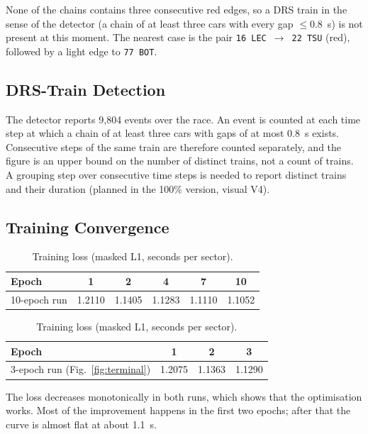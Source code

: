\documentclass[11pt,a4paper]{article}
\begin{document}
None of the chains contains three consecutive red edges, so a DRS train in the
sense of the detector (a chain of at least three cars with every gap $\le 0.8$~s)
is not present at this moment. The nearest case is the pair
\texttt{16 LEC}~$\to$~\texttt{22 TSU} (red), followed by a light edge to
\texttt{77 BOT}.

\subsection{DRS-Train Detection}
The detector reports 9{,}804 events over the race. An event is counted at each
time step at which a chain of at least three cars with gaps of at most 0.8~s
exists. Consecutive steps of the same train are therefore counted separately,
and the figure is an upper bound on the number of distinct trains, not a
count of trains. A grouping step over consecutive time steps is needed to
report distinct trains and their duration (planned in the 100\% version,
visual V4).

\subsection{Training Convergence}
\begin{table}[H]
\centering
\caption{Training loss (masked L1, seconds per sector).}
\label{tab:loss}
\small
\begin{tabular}{@{}lccccc@{}}
\toprule
\textbf{Epoch} & 1 & 2 & 4 & 7 & 10 \\
\midrule
10-epoch run & 1.2110 & 1.1405 & 1.1283 & 1.1110 & 1.1052 \\
\bottomrule
\end{tabular}

\vspace{1mm}
\begin{tabular}{@{}lccc@{}}
\toprule
\textbf{Epoch} & 1 & 2 & 3 \\
\midrule
3-epoch run (Fig.~\ref{fig:terminal}) & 1.2075 & 1.1363 & 1.1290 \\
\bottomrule
\end{tabular}
\end{table}
The loss decreases monotonically in both runs, which shows that the
optimisation works. Most of the improvement happens in the first two epochs;
after that the curve is almost flat at about 1.1~s.
\end{document}
